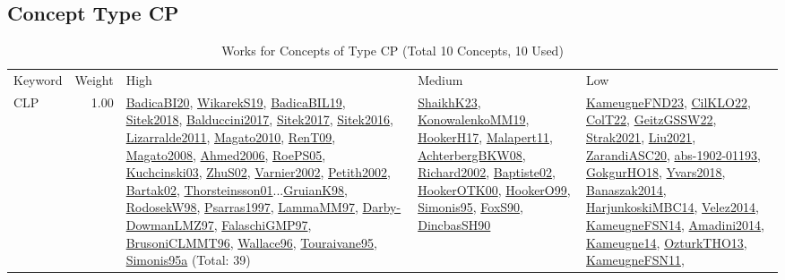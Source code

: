 \subsection{Concept Type CP}
\label{sec:CP}
\label{CP}
{\scriptsize
\begin{longtable}{p{3cm}r>{\raggedright\arraybackslash}p{6cm}>{\raggedright\arraybackslash}p{6cm}>{\raggedright\arraybackslash}p{8cm}}
\rowcolor{white}\caption{Works for Concepts of Type CP (Total 10 Concepts, 10 Used)}\\ \toprule
\rowcolor{white}Keyword & Weight & High & Medium & Low\\ \midrule\endhead
\bottomrule
\endfoot
\index{CLP}\index{CP!CLP}CLP &  1.00 & \hyperref[detail:BadicaBI20]{BadicaBI20}, \hyperref[detail:WikarekS19]{WikarekS19}, \hyperref[detail:BadicaBIL19]{BadicaBIL19}, \hyperref[detail:Sitek2018]{Sitek2018}, \hyperref[detail:Balduccini2017]{Balduccini2017}, \hyperref[detail:Sitek2017]{Sitek2017}, \hyperref[detail:Sitek2016]{Sitek2016}, \hyperref[detail:Lizarralde2011]{Lizarralde2011}, \hyperref[detail:Magato2010]{Magato2010}, \hyperref[detail:RenT09]{RenT09}, \hyperref[detail:Magato2008]{Magato2008}, \hyperref[detail:Ahmed2006]{Ahmed2006}, \hyperref[detail:RoePS05]{RoePS05}, \hyperref[detail:Kuchcinski03]{Kuchcinski03}, \hyperref[detail:ZhuS02]{ZhuS02}, \hyperref[detail:Varnier2002]{Varnier2002}, \hyperref[detail:Petith2002]{Petith2002}, \hyperref[detail:Bartak02]{Bartak02}, \hyperref[detail:Thorsteinsson01]{Thorsteinsson01}...\hyperref[detail:GruianK98]{GruianK98}, \hyperref[detail:RodosekW98]{RodosekW98}, \hyperref[detail:Psarras1997]{Psarras1997}, \hyperref[detail:LammaMM97]{LammaMM97}, \hyperref[detail:Darby-DowmanLMZ97]{Darby-DowmanLMZ97}, \hyperref[detail:FalaschiGMP97]{FalaschiGMP97}, \hyperref[detail:BrusoniCLMMT96]{BrusoniCLMMT96}, \hyperref[detail:Wallace96]{Wallace96}, \hyperref[detail:Touraivane95]{Touraivane95}, \hyperref[detail:Simonis95a]{Simonis95a} (Total: 39) & \hyperref[detail:ShaikhK23]{ShaikhK23}, \hyperref[detail:KonowalenkoMM19]{KonowalenkoMM19}, \hyperref[detail:HookerH17]{HookerH17}, \hyperref[detail:Malapert11]{Malapert11}, \hyperref[detail:AchterbergBKW08]{AchterbergBKW08}, \hyperref[detail:Richard2002]{Richard2002}, \hyperref[detail:Baptiste02]{Baptiste02}, \hyperref[detail:HookerOTK00]{HookerOTK00}, \hyperref[detail:HookerO99]{HookerO99}, \hyperref[detail:Simonis95]{Simonis95}, \hyperref[detail:FoxS90]{FoxS90}, \hyperref[detail:DincbasSH90]{DincbasSH90} & \hyperref[detail:KameugneFND23]{KameugneFND23}, \hyperref[detail:CilKLO22]{CilKLO22}, \hyperref[detail:ColT22]{ColT22}, \hyperref[detail:GeitzGSSW22]{GeitzGSSW22}, \hyperref[detail:Strak2021]{Strak2021}, \hyperref[detail:Liu2021]{Liu2021}, \hyperref[detail:ZarandiASC20]{ZarandiASC20}, \hyperref[detail:abs-1902-01193]{abs-1902-01193}, \hyperref[detail:GokgurHO18]{GokgurHO18}, \hyperref[detail:Yvars2018]{Yvars2018}, \hyperref[detail:Banaszak2014]{Banaszak2014}, \hyperref[detail:HarjunkoskiMBC14]{HarjunkoskiMBC14}, \hyperref[detail:Velez2014]{Velez2014}, \hyperref[detail:KameugneFSN14]{KameugneFSN14}, \hyperref[detail:Amadini2014]{Amadini2014}, \hyperref[detail:Kameugne14]{Kameugne14}, \hyperref[detail:OzturkTHO13]{OzturkTHO13}, \hyperref[detail:KameugneFSN11]{KameugneFSN11}, 
\end{longtable}}
